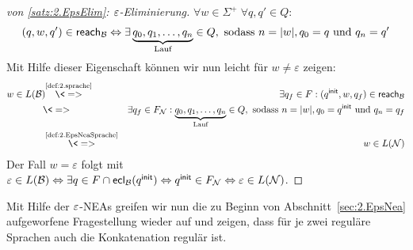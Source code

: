 {\begin{proof}[von \autoref{satz:2.EpsElim}: $\varepsilon$-Eliminierung]
        $\forall w\in\Sigma^+\; \forall q, q'\in Q:$
        $$(q,w,q')\in\textsf{reach}_{\mathcal{B}} \Leftrightarrow \exists \underbrace{q_0, q_1,\ldots, q_n}_{\text{Lauf}}\in Q, \text{ sodass }  n=|w|, q_0=q \text{ und } q_n=q'$$
        Mit Hilfe dieser Eigenschaft können wir nun leicht für $w \neq \varepsilon$ zeigen:
        \begin{eqnarray*}
         w\in L(\B) \hspace*{-1mm}
         &\stackrel{\text{\autoref{def:2.sprache}}}{\<=>} & \exists q_f\in F: (\qinit, w, q_f)\in\reach_\B\\
         &\<=> & \exists q_f\in F_\calN: \underbrace{q_0, q_1,\ldots, q_n}_{\text{Lauf}}\in Q, \text{ sodass }  n=|w|, q_0=\qinit \text{ und } q_n=q_f\\
         &\stackrel{\text{\autoref{def:2.EpsNeaSprache}}}{\<=>} & w \in L(\calN)
        \end{eqnarray*}
        Der Fall $w = \varepsilon$ folgt mit $\varepsilon \in L(\mathcal{B}) \Leftrightarrow \exists q \in F \cap \textsf{ecl}_{\mathcal{B}}(q^\mathsf{init}) \Leftrightarrow q^\mathsf{init} \in F_{\mathcal{N}} \Leftrightarrow \varepsilon \in L(\mathcal{N})$.
\end{proof}


\medskip

Mit Hilfe der $\varepsilon$-NEAs greifen wir nun die zu Beginn von Abschnitt~\ref{sec:2.EpsNea} aufgeworfene Fragestellung wieder auf und zeigen, dass für je zwei reguläre Sprachen auch die Konkatenation regulär ist.

}
